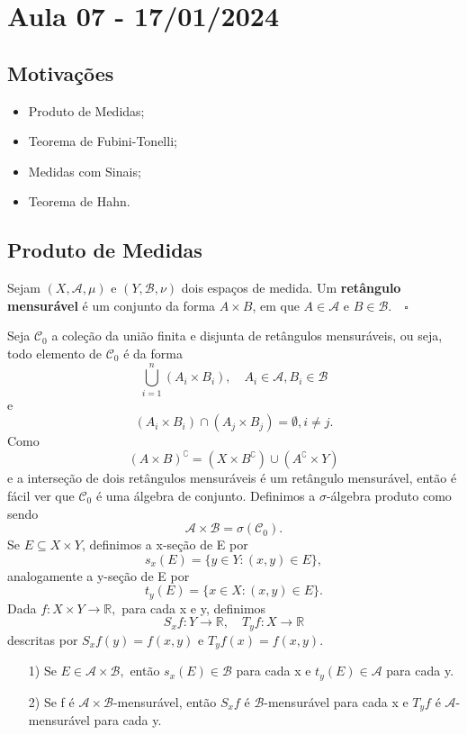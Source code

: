 \documentclass[MeasureTheory/measure_theory.tex]{subfiles}
\begin{document}
\section{Aula 07 - 17/01/2024}
\subsection{Motivações}
\begin{itemize}
	\item Produto de Medidas;
	\item Teorema de Fubini-Tonelli;
	\item Medidas com Sinais;
	\item Teorema de Hahn.
\end{itemize}
\subsection{Produto de Medidas}
\begin{def*}
	Sejam \((X, \mathcal{A}, \mu )\) e \((Y, \mathcal{B}, \nu)\) dois espaços de medida. Um \textbf{retângulo mensurável} é um
	conjunto da forma \(A\times B\), em que \(A\in \mathcal{A}\) e \(B\in \mathcal{B}.\quad \square\)
\end{def*}
Seja \(\mathcal{C}_{0}\) a coleção da união finita e disjunta de retângulos mensuráveis, ou seja, todo elemento de \(\mathcal{C}_{0}\) é da forma
\[
	\bigcup_{i=1}^{n}(A_{i}\times B_{i}),\quad A_{i}\in \mathcal{A}, B_{i}\in \mathcal{B}
\]
e
\[
	(A_{i}\times B_{i})\cap (A_{j}\times B_{j}) = \emptyset , i\neq j.
\]
Como
\[
	(A\times B)^{\complement} = (X\times B ^{\complement})\cup (A ^{\complement}\times Y)
\]
e a interseção de dois retângulos mensuráveis é um retângulo mensurável, então é fácil ver que \(\mathcal{C}_{0}\) é uma álgebra de conjunto. Definimos a \(\sigma \)-álgebra produto como sendo
\[
	\mathcal{A}\times \mathcal{B} = \sigma (\mathcal{C}_{0}).
\]
Se \(E\subseteq X\times Y\), definimos a x-seção de E por
\[
	s_x(E) = \{y\in Y: (x, y)\in E\},
\]
analogamente a y-seção de E por
\[
	t_y(E) = \{x\in X: (x, y)\in E\}.
\]
Dada \(f:X\times Y\rightarrow \mathbb{R},\) para cada x e y, definimos
\[
	S_{x}f :Y\rightarrow \mathbb{R}, \quad T_{y}f:X\rightarrow \mathbb{R}
\]
descritas por \(S_xf(y) = f(x, y)\) e \(T_yf(x) = f(x, y).\)
\begin{lemma*}
	\begin{itemize}
		\item[1)] Se \(E\in \mathcal{A}\times \mathcal{B},\) então \(s_x(E)\in \mathcal{B}\) para cada x e \(t_y(E)\in \mathcal{A}\) para cada y.
		\item[2)] Se f é \(\mathcal{A}\times \mathcal{B}\)-mensurável, então \(S_{x}f\) é \(\mathcal{B}\)-mensurável para cada x e \(T_yf\) é \(\mathcal{A}\)-mensurável para cada y.
	\end{itemize}
\end{lemma*}
\end{document}
